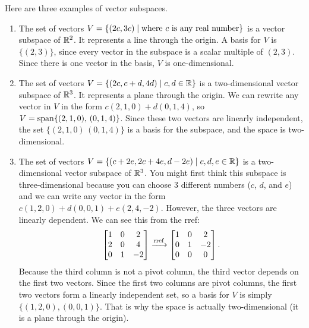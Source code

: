 \begin{example}\label{RR subspace examples}
Here are three examples of vector subspaces.
\begin{enumerate}
	\item 
The set of vectors $V=\{(2c,3c)\mid \text{where $c$ is any real number}\}$ is a vector subspace of $\mathbb{R}^2$. It represents a line through the origin.  A basis for $V$ is $\{(2,3)\}$, since every vector in the subspace is a scalar multiple of $(2,3)$.  Since there is one vector in the basis, $V$ is one-dimensional.
  \item
The set of vectors $V=\{(2c,c+d,4d)\mid c,d\in \mathbb{R}\}$ is a two-dimensional vector subspace of $\mathbb{R}^3$. It represents a plane through the origin. We can rewrite any vector in $V$ in the form $c(2,1,0)+d(0,1,4)$, so $V=\operatorname{span}\{(2,1,0),\, (0,1,4)\}$.  Since these two vectors are linearly independent, the set $\{(2,1,0)\, (0,1,4)\}$ is a basis for the subspace, and the space is two-dimensional.
\item
The set of vectors $V=\{(c+2e,2c+4e,d-2e)\mid c,d,e\in \mathbb{R}\}$ is a two-dimensional vector subspace of $\mathbb{R}^3$. You might first think this subspace is three-dimensional because you can choose 3 different numbers ($c$, $d$, and $e$) and we can write any vector in the form $c(1,2,0)+d(0,0,1)+e(2,4,-2)$.  However, the three vectors are linearly dependent.  We can see this from the rref:
\begin{equation*}
\begin{bmatrix}
\begin{matrix} 1\\2\\0 \end{matrix}&
\begin{matrix} 0\\0\\1 \end{matrix}&
\begin{matrix} 2\\4\\-2 \end{matrix}
\end{bmatrix}
\xrightarrow{\operatorname{rref}}
\begin{bmatrix}
\begin{matrix} 1\\0\\0 \end{matrix}&
\begin{matrix} 0\\1\\0 \end{matrix}&
\begin{matrix} 2\\-2\\0 \end{matrix}
\end{bmatrix}.
\end{equation*}
Because the third column is not a pivot column, the third vector depends on the first two vectors.  Since the first two columns are pivot columns, the first two vectors form a linearly independent set, so a basis for $V$ is simply $\{(1,2,0),(0,0,1)\}$.  That is why the space is actually two-dimensional (it is a plane through the origin).
\end{enumerate}
\end{example}
